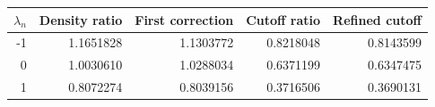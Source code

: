\begin{tabular}{rrrrr}
\toprule
$\lambda_n$ & Density ratio & First correction & Cutoff ratio & Refined cutoff \\
\midrule
-1 & 1.1651828 & 1.1303772 & 0.8218048 & 0.8143599 \\
0 & 1.0030610 & 1.0288034 & 0.6371199 & 0.6347475 \\
1 & 0.8072274 & 0.8039156 & 0.3716506 & 0.3690131 \\
\bottomrule
\end{tabular}

